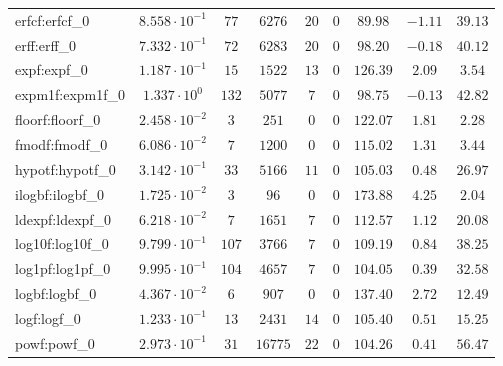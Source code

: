 \begin{tabular}{|l|c|c|c|c|c|c|c|c|}
erfcf:erfcf\_0               & $ 8.558 \cdot 10^{-1} $ & $ 77     $ & $ 6276   $ & $ 20  $ & $ 0   $ & $ 89.98       $ & $ -1.11   $ & $ 39.13   $ \\
erff:erff\_0                 & $ 7.332 \cdot 10^{-1} $ & $ 72     $ & $ 6283   $ & $ 20  $ & $ 0   $ & $ 98.20       $ & $ -0.18   $ & $ 40.12   $ \\
expf:expf\_0                 & $ 1.187 \cdot 10^{-1} $ & $ 15     $ & $ 1522   $ & $ 13  $ & $ 0   $ & $ 126.39      $ & $ 2.09    $ & $ 3.54    $ \\
expm1f:expm1f\_0             & $ 1.337 \cdot 10^{0}  $ & $ 132    $ & $ 5077   $ & $ 7   $ & $ 0   $ & $ 98.75       $ & $ -0.13   $ & $ 42.82   $ \\
floorf:floorf\_0             & $ 2.458 \cdot 10^{-2} $ & $ 3      $ & $ 251    $ & $ 0   $ & $ 0   $ & $ 122.07      $ & $ 1.81    $ & $ 2.28    $ \\
fmodf:fmodf\_0               & $ 6.086 \cdot 10^{-2} $ & $ 7      $ & $ 1200   $ & $ 0   $ & $ 0   $ & $ 115.02      $ & $ 1.31    $ & $ 3.44    $ \\
hypotf:hypotf\_0             & $ 3.142 \cdot 10^{-1} $ & $ 33     $ & $ 5166   $ & $ 11  $ & $ 0   $ & $ 105.03      $ & $ 0.48    $ & $ 26.97   $ \\
ilogbf:ilogbf\_0             & $ 1.725 \cdot 10^{-2} $ & $ 3      $ & $ 96     $ & $ 0   $ & $ 0   $ & $ 173.88      $ & $ 4.25    $ & $ 2.04    $ \\
ldexpf:ldexpf\_0             & $ 6.218 \cdot 10^{-2} $ & $ 7      $ & $ 1651   $ & $ 7   $ & $ 0   $ & $ 112.57      $ & $ 1.12    $ & $ 20.08   $ \\
log10f:log10f\_0             & $ 9.799 \cdot 10^{-1} $ & $ 107    $ & $ 3766   $ & $ 7   $ & $ 0   $ & $ 109.19      $ & $ 0.84    $ & $ 38.25   $ \\
log1pf:log1pf\_0             & $ 9.995 \cdot 10^{-1} $ & $ 104    $ & $ 4657   $ & $ 7   $ & $ 0   $ & $ 104.05      $ & $ 0.39    $ & $ 32.58   $ \\
logbf:logbf\_0               & $ 4.367 \cdot 10^{-2} $ & $ 6      $ & $ 907    $ & $ 0   $ & $ 0   $ & $ 137.40      $ & $ 2.72    $ & $ 12.49   $ \\
logf:logf\_0                 & $ 1.233 \cdot 10^{-1} $ & $ 13     $ & $ 2431   $ & $ 14  $ & $ 0   $ & $ 105.40      $ & $ 0.51    $ & $ 15.25   $ \\
powf:powf\_0                 & $ 2.973 \cdot 10^{-1} $ & $ 31     $ & $ 16775  $ & $ 22  $ & $ 0   $ & $ 104.26      $ & $ 0.41    $ & $ 56.47   $ \\

\end{tabular}

